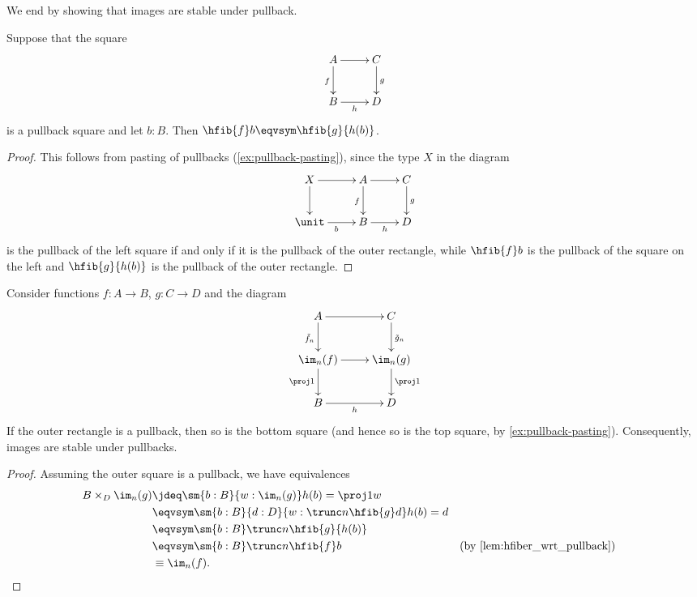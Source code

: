 We end by showing that images are stable under pullback.

\begin{lem}\label{lem:hfiber_wrt_pullback}
Suppose that the square
\begin{equation*}
  \vcenter{\xymatrix{
      A\ar[r]\ar[d]_f &
      C\ar[d]^g\\
      B\ar[r]_-h &
      D
      }}
\end{equation*}
is a pullback square and let $b:B$. Then $\hfib{f}b\eqvsym\hfib{g}{h(b)}$.
\end{lem}

\begin{proof}
This follows from pasting of pullbacks (\cref{ex:pullback-pasting}), since the type $X$ in the diagram
\begin{equation*}
  \vcenter{\xymatrix{
      X\ar[r]\ar[d] &
      A\ar[r]\ar[d]_f &
      C\ar[d]^g\\
      \unit\ar[r]_b &
      B\ar[r]_h &
      D
      }}
\end{equation*}
is the pullback of the left square if and only if it is the pullback of the outer rectangle, while $\hfib{f}b$ is the pullback of the square on the left and $\hfib{g}{h(b)}$ is the pullback of the outer rectangle.
\end{proof}

\begin{thm}\label{thm:stable-images}
%
Consider functions $f:A\to B$, $g:C\to D$ and the diagram
\begin{equation*}
  \vcenter{\xymatrix{
      A\ar[r]\ar[d]_{\tilde{f}_n} &
      C\ar[d]^{\tilde{g}_n}\\
      \im_n(f)\ar[r]\ar[d]_{\proj1} &
      \im_n(g)\ar[d]^{\proj1}\\
      B\ar[r]_h &
      D
      }}
\end{equation*}
If the outer rectangle is a pullback, then so is the bottom square (and hence so is the top square, by \cref{ex:pullback-pasting}). Consequently, images are stable under pullbacks.
\end{thm}

\begin{proof}
Assuming the outer square is a pullback, we have equivalences
\begin{align*}
B\times_D\im_n(g) & \jdeq \sm{b:B}{w:\im_n(g)} h(b)=\proj1 w\\
& \eqvsym \sm{b:B}{d:D}{w:\trunc n{\hfib{g}d}} h(b)= d\\
& \eqvsym \sm{b:B} \trunc n{\hfib{g}{h(b)}}\\
& \eqvsym \sm{b:B} \trunc n{\hfib{f}b} &&
\text{(by \cref{lem:hfiber_wrt_pullback})}\\
& \equiv \im_n(f). && \qedhere
\end{align*}
\end{proof}

